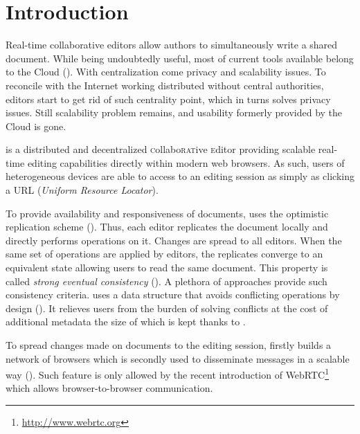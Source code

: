 
\section{Introduction}
\label{sec:introduction}

Real-time collaborative editors allow authors to simultaneously write a shared
document. While being undoubtedly useful, most of current tools available belong
to the Cloud (\REF). With centralization come privacy and scalability issues. To
reconcile with the Internet working distributed without central authorities,
editors start to get rid of such centrality point, which in turns solves privacy
issues. Still scalability problem remains, and usability formerly provided by
the Cloud is gone.

\CRATE is a distributed and decentralized \textsc{c}ollabo\textsc{rat}ive
\textsc{e}ditor providing scalable real-time editing capabilities directly
within modern web browsers. As such, users of heterogeneous devices are able to
access to an editing session as simply as clicking a URL (\emph{Uniform Resource
  Locator}).

To provide availability and responsiveness of documents, \CRATE uses the
optimistic replication scheme (\REF). Thus, each editor replicates the document
locally and directly performs operations on it. Changes are spread to all
editors. When the same set of operations are applied by editors, the replicates
converge to an equivalent state allowing users to read the same document.  This
property is called \emph{strong eventual consistency} (\REF). A plethora of
approaches provide such consistency criteria. \CRATE uses a data structure that
avoids conflicting operations by design (\REF). It relieves users from the
burden of solving conflicts at the cost of additional metadata the size of
which is kept  thanks to \LSEQ. 

To spread changes made on documents to the editing session, \CRATE firstly
builds a network of browsers which is secondly used to disseminate messages in a
scalable way (\REF). Such feature is only allowed by the recent introduction of
WebRTC\footnote{\url{http://www.webrtc.org}} which allows browser-to-browser
communication.


